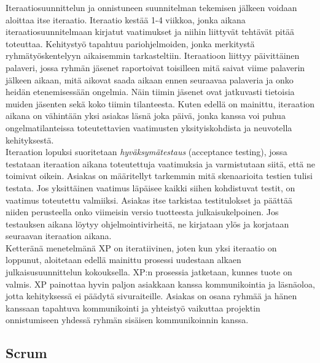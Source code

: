 \documentclass[finnish]{../tktltiki2}
\theoremstyle{definition}
\theoremstyle{remark}
\begin{document}
Iteraatiosuunnittelun ja onnistuneen suunnitelman tekemisen jälkeen voidaan aloittaa itse iteraatio. Iteraatio kestää 1-4 viikkoa, jonka aikana iteraatiosuunnitelmaan kirjatut vaatimukset ja niihin liittyvät tehtävät pitää toteuttaa. Kehitystyö tapahtuu pariohjelmoiden, jonka
merkitystä ryhmätyöskentelyyn aikaisemmin tarkasteltiin. Iteraatioon liittyy päivittäinen palaveri, jossa ryhmän jäsenet raportoivat toisilleen mitä saivat viime palaverin jälkeen aikaan, mitä aikovat saada aikaan ennen seuraavaa palaveria ja onko heidän etenemisessään ongelmia. Näin tiimin jäsenet ovat jatkuvasti tietoisia
muiden jäsenten sekä koko tiimin tilanteesta. Kuten edellä on mainittu, iteraation aikana on vähintään yksi asiakas läsnä joka päivä, jonka kanssa voi puhua ongelmatilanteissa toteutettavien vaatimusten yksityiskohdista ja neuvotella kehityksestä.\\

Iteraation lopuksi suoritetaan \emph{hyväksymätestaus} (acceptance testing), jossa testataan iteraation aikana toteutettuja vaatimuksia ja varmistutaan siitä, että ne toimivat oikein. Asiakas on määritellyt tarkemmin mitä skenaarioita testien tulisi testata. Jos yksittäinen vaatimus läpäisee kaikki siihen kohdistuvat testit, on vaatimus toteutettu valmiiksi. Asiakas itse tarkistaa testitulokset ja päättää niiden perusteella onko viimeisin versio tuotteesta julkaisukelpoinen. Jos testauksen aikana löytyy ohjelmointivirheitä, ne kirjataan ylös ja korjataan seuraavan iteraation aikana.\\

Ketteränä menetelmänä XP on iteratiivinen, joten kun yksi iteraatio on loppunut, aloitetaan edellä mainittu prosessi uudestaan alkaen julkaisusuunnittelun kokouksella. XP:n prosessia jatketaan, kunnes tuote on valmis. XP painottaa hyvin paljon asiakkaan kanssa kommunikointia ja läsnäoloa, jotta kehityksessä ei päädytä sivuraiteille. Asiakas on osana ryhmää ja hänen kanssaan tapahtuva kommunikointi ja yhteistyö vaikuttaa projektin onnistumiseen yhdessä ryhmän sisäisen kommunikoinnin kanssa.

\subsection{Scrum}
\end{document}

